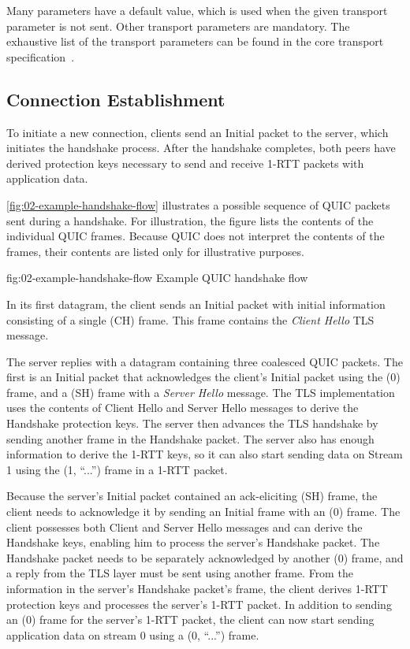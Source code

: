 Many parameters have a default value, which is used when the given transport parameter is not sent.
Other transport parameters are mandatory. The exhaustive list of the transport parameters can be
found in the core transport specification~\cite[Section~7.3]{draft-ietf-quic-transport}.

\subsection{Connection Establishment}\label{sec:02-connection-establishment}

To initiate a new connection, clients send an Initial packet to the server, which initiates the
handshake process. After the handshake completes, both peers have derived protection keys necessary
to send and receive 1-RTT packets with application data.

\autoref{fig:02-example-handshake-flow} illustrates a possible sequence of QUIC packets sent during
a handshake. For illustration, the figure lists the contents of the individual QUIC frames. Because
QUIC does not interpret the contents of the \CRYPTO{} frames, their contents are listed only for
illustrative purposes.

\begin{myFigure} {fig:02-example-handshake-flow} {Example QUIC handshake flow}

\resizebox{\linewidth}{!}{}

\end{myFigure}

In its first datagram, the client sends an Initial packet with initial information consisting of a
single \CRYPTO{}(CH) frame. This frame contains the \textit{Client Hello} TLS message.

The server replies with a datagram containing three coalesced QUIC packets. The first is an Initial
packet that acknowledges the client's Initial packet using the \ACK{}(0) frame, and a \CRYPTO{}(SH)
frame with a \textit{Server Hello} message. The TLS implementation uses the contents of Client Hello
and Server Hello messages to derive the Handshake protection keys. The server then advances the TLS
handshake by sending another \CRYPTO{} frame in the Handshake packet. The server also has enough
information to derive the 1-RTT keys, so it can also start sending data on Stream 1 using the
\STREAM{}(1, ``...'') frame in a 1-RTT packet.

Because the server's Initial packet contained an ack-eliciting \CRYPTO{}(SH) frame, the client needs
to acknowledge it by sending an Initial frame with an \ACK{}(0) frame. The client possesses both
Client and Server Hello messages and can derive the Handshake keys, enabling him to process the
server's Handshake packet. The Handshake packet needs to be separately acknowledged by another
\ACK{}(0) frame, and a reply from the TLS layer must be sent using another \CRYPTO{} frame. From the
information in the server's Handshake packet's \CRYPTO{} frame, the client derives 1-RTT protection
keys and processes the server's 1-RTT packet. In addition to sending an \ACK{}(0) frame for the
server's 1-RTT packet, the client can now start sending application data on stream 0 using a
\STREAM{}(0, ``...'') frame.

